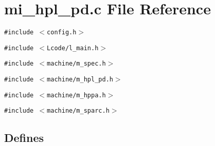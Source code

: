 \section{mi\_\-hpl\_\-pd.c File Reference}
\label{mi__hpl__pd_8c}
{\tt \#include $<$config.h$>$}\par
{\tt \#include $<$Lcode/l\_\-main.h$>$}\par
{\tt \#include $<$machine/m\_\-spec.h$>$}\par
{\tt \#include $<$machine/m\_\-hpl\_\-pd.h$>$}\par
{\tt \#include $<$machine/m\_\-hppa.h$>$}\par
{\tt \#include $<$machine/m\_\-sparc.h$>$}\par
\subsection*{Defines}
